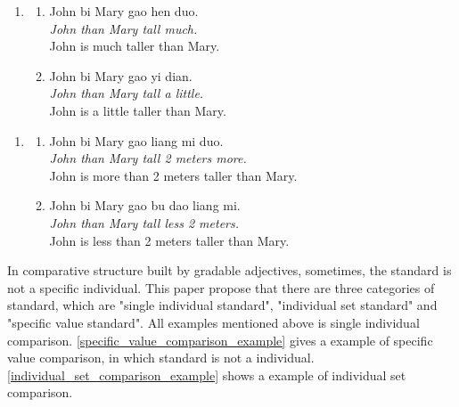 \documentclass{ctexart}
\begin{document}
\begin{enumerate}
    \item
    \begin{enumerate}
        \item \label{dp_big_vague_example}
        John bi Mary gao hen duo.\\
        \textit{John than Mary tall much.} \\
        John is much taller than Mary.

        \item \label{dp_small_vague_example}
        John bi Mary gao yi dian.\\
        \textit{John than Mary tall a little.}\\
        John is a little taller than Mary.

    \end{enumerate}
\end{enumerate}

\begin{enumerate}
    \item
    \begin{enumerate}
        \item \label{dp_value_big_vague_example}
        John bi Mary gao liang mi duo.\\
        \textit{John than Mary tall 2 meters more.} \\
        John is more than 2 meters taller than Mary.

        \item \label{dp_value_small_vague_example}
        John bi Mary gao bu dao liang mi.\\
        \textit{John than Mary tall less 2 meters.} \\
        John is less than 2 meters taller than Mary.
    \end{enumerate}
\end{enumerate}

\noindent
In comparative structure built by gradable adjectives, sometimes, the standard is not a specific individual. This paper propose that there are three categories of standard, which are "single individual standard", "individual set standard" and "specific value standard". All examples mentioned above is single individual comparison. \ref{specific_value_comparison_example} gives a example of specific value comparison, in which standard is not a individual. \ref{individual_set_comparison_example} shows a example of individual set comparison.
\end{document}
